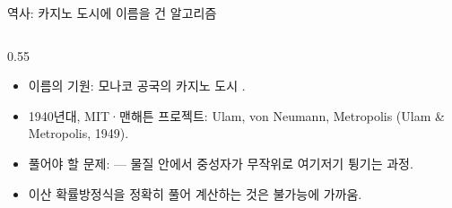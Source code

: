 \begin{frame}{역사: 카지노 도시에 이름을 건 알고리즘}
  \begin{columns}[T]
    \begin{column}{0.55\textwidth}
      \begin{itemize}
        \item 이름의 기원: 모나코 공국의 카지노 도시
          .
        \item 1940년대, MIT·맨해튼 프로젝트: Ulam,
          von Neumann, Metropolis (Ulam \& Metropolis, 1949).
        \item 풀어야 할 문제:  --- 물질 안에서
          중성자가 무작위로 여기저기 튕기는 과정.
        \item 이산 확률방정식을 정확히 풀어 계산하는 것은
          불가능에 가까움.
      \end{itemize}
    \end{column}
  \end{columns}
\end{frame}

